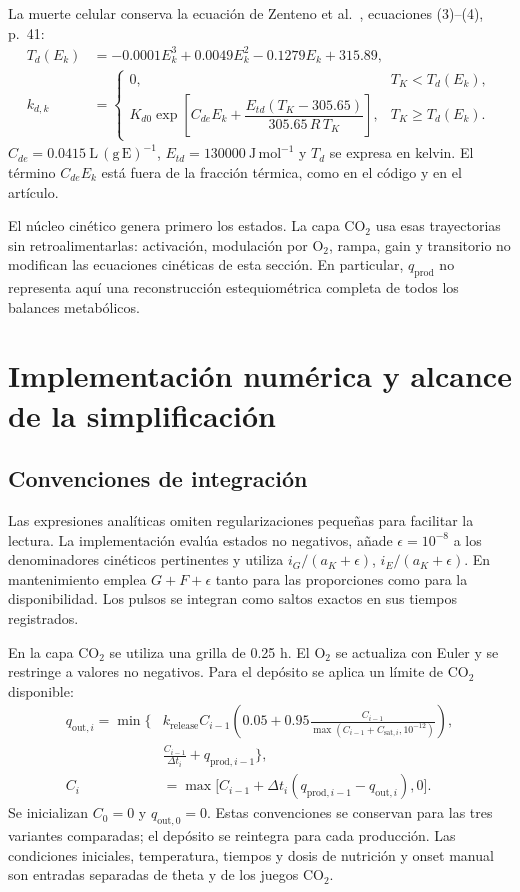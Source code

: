 \documentclass[11pt,a4paper]{article}
\newcommand{\qprod}{q_{\mathrm{prod}}}
\begin{document}
La muerte celular conserva la ecuación de Zenteno et al.~\cite{zenteno2010},
ecuaciones (3)--(4), p.~41:
\begin{align}
T_d(E_k)&=-0.0001E_k^3+0.0049E_k^2-0.1279E_k+315.89,\label{eq:Td}\\
k_{d,k}&=\begin{cases}
0,&T_K<T_d(E_k),\\[1mm]
K_{d0}\exp\!\left[C_{de}E_k+
\dfrac{E_{td}(T_K-305.65)}{305.65\,R\,T_K}\right],&T_K\ge T_d(E_k).
\end{cases}\label{eq:death}
\end{align}
$C_{de}=0.0415\ \mathrm{L\,(g\,E)^{-1}}$,
$E_{td}=130000\ \mathrm{J\,mol^{-1}}$ y $T_d$ se expresa en kelvin.
El término $C_{de}E_k$ está fuera de la fracción térmica, como en el código
y en el artículo.

El núcleo cinético genera primero los estados. La capa CO\(_2\) usa esas
trayectorias sin retroalimentarlas: activación, modulación por O\(_2\),
rampa, gain y transitorio no modifican las ecuaciones cinéticas de esta
sección. En particular, $\qprod$ no representa aquí una reconstrucción
estequiométrica completa de todos los balances metabólicos.

\section{Implementación numérica y alcance de la simplificación}

\subsection{Convenciones de integración}

Las expresiones analíticas omiten regularizaciones pequeñas para facilitar
la lectura. La implementación evalúa estados no negativos, añade
$\epsilon=10^{-8}$ a los denominadores cinéticos pertinentes y utiliza
$i_G/(a_K+\epsilon)$, $i_E/(a_K+\epsilon)$. En mantenimiento emplea
$G+F+\epsilon$ tanto para las proporciones como para la disponibilidad.
Los pulsos se integran como saltos exactos en sus tiempos registrados.

En la capa CO\(_2\) se utiliza una grilla de 0.25 h. El O\(_2\) se actualiza
con Euler y se restringe a valores no negativos. Para el depósito se aplica
un límite de CO\(_2\) disponible:
\begin{align}
q_{\mathrm{out},i}=\min\Biggl\{&k_{\mathrm{release}}C_{i-1}
\left(0.05+0.95\frac{C_{i-1}}
{\max(C_{i-1}+C_{\mathrm{sat},i},10^{-12})}\right),\nonumber\\
&\frac{C_{i-1}}{\Delta t_i}+q_{\mathrm{prod},i-1}\Biggr\},\label{eq:Eulerq}\\
C_i&=\max\bigl[C_{i-1}+\Delta t_i(q_{\mathrm{prod},i-1}-q_{\mathrm{out},i}),0\bigr].\label{eq:EulerC}
\end{align}
Se inicializan $C_0=0$ y $q_{\mathrm{out},0}=0$. Estas convenciones se conservan para
las tres variantes comparadas; el depósito se reintegra para cada producción.
Las condiciones iniciales, temperatura, tiempos y dosis de nutrición y onset
manual son entradas separadas de theta y de los juegos CO\(_2\).
\end{document}
